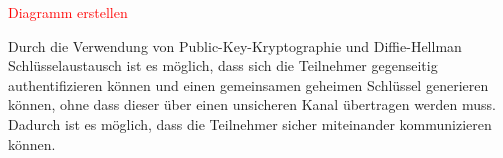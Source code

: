 \textcolor{red}{Diagramm erstellen}

\noindent Durch die Verwendung von Public-Key-Kryptographie und Diffie-Hellman Schlüsselaustausch ist es möglich, dass sich die Teilnehmer gegenseitig authentifizieren können und einen gemeinsamen geheimen Schlüssel generieren können, ohne dass dieser über einen unsicheren Kanal übertragen werden muss. Dadurch ist es möglich, dass die Teilnehmer sicher miteinander kommunizieren können. 

